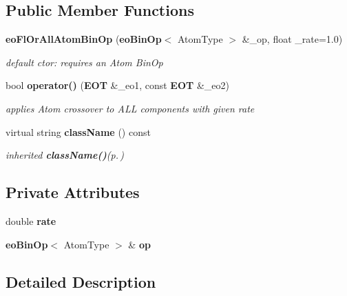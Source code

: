 \subsection*{Public Member Functions}
\begin{CompactItemize}
\item 
{\bf eo\-Fl\-Or\-All\-Atom\-Bin\-Op} ({\bf eo\-Bin\-Op}$<$ Atom\-Type $>$ \&\_\-op, float \_\-rate=1.0)\label{classeo_fl_or_all_atom_bin_op_a0}

\begin{CompactList}\small\item\em default ctor: requires an Atom Bin\-Op \item\end{CompactList}\item 
bool {\bf operator()} ({\bf EOT} \&\_\-eo1, const {\bf EOT} \&\_\-eo2)\label{classeo_fl_or_all_atom_bin_op_a1}

\begin{CompactList}\small\item\em applies Atom crossover to ALL components with given rate \item\end{CompactList}\item 
virtual string {\bf class\-Name} () const \label{classeo_fl_or_all_atom_bin_op_a2}

\begin{CompactList}\small\item\em inherited {\bf class\-Name()}{\rm (p.\,\pageref{classeo_fl_or_all_atom_bin_op_a2})} \item\end{CompactList}\end{CompactItemize}
\subsection*{Private Attributes}
\begin{CompactItemize}
\item 
double {\bf rate}\label{classeo_fl_or_all_atom_bin_op_r0}

\item 
{\bf eo\-Bin\-Op}$<$ Atom\-Type $>$ \& {\bf op}\label{classeo_fl_or_all_atom_bin_op_r1}

\end{CompactItemize}


\subsection{Detailed Description}
